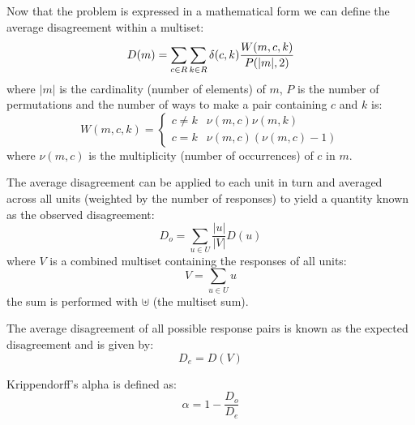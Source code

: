 \documentclass{article}
\begin{document}
Now that the problem is expressed in a mathematical form we can define the
average disagreement within a multiset:
\begin{equation}
D(m) = \sum_{c \in R} \sum_{k \in R} \delta(c, k) \frac{W(m, c, k)}{P(|m|, 2)}
\end{equation}
where $|m|$ is the cardinality (number of elements) of $m$, $P$ is the number
of permutations and the number of ways to make a pair containing $c$ and $k$
is:
\begin{equation}
W(m, c, k) =
\begin{cases}
c \ne k & \nu(m, c) \nu(m, k) \\
c = k & \nu(m, c) (\nu(m, c) - 1)
\end{cases}
\end{equation}
where $\nu(m, c)$ is the multiplicity (number of occurrences) of $c$ in $m$.

The average disagreement can be applied to each unit in turn and averaged
across all units (weighted by the number of responses) to yield a quantity
known as the observed disagreement:
\begin{equation}
D_o = \sum_{u \in U} \frac{|u|}{|V|}D(u)
\end{equation}
where $V$ is a combined multiset containing the responses of all units:
\begin{equation}
V = \sum_{u \in U}u
\end{equation}
the sum is performed with $\uplus$ (the multiset sum).

The average disagreement of all possible response pairs is known as the
expected disagreement and is given by:
\begin{equation}
D_e = D(V)
\end{equation}

Krippendorff's alpha is defined as:
\begin{equation}
\alpha = 1 - \frac{D_o}{D_e}
\end{equation}
\end{document}
